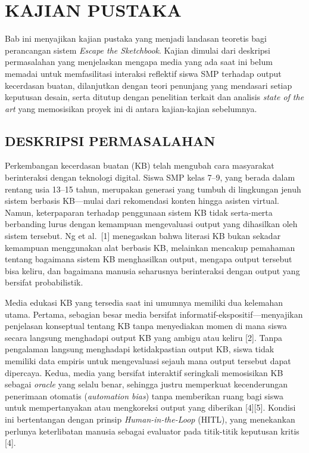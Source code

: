 \documentclass[10pt,twoside,openright]{report}
\begin{document}
\chapter{KAJIAN PUSTAKA}
\label{chap:bab2}

Bab ini menyajikan kajian pustaka yang menjadi landasan teoretis bagi perancangan sistem \textit{Escape the Sketchbook}. Kajian dimulai dari deskripsi permasalahan yang menjelaskan mengapa media yang ada saat ini belum memadai untuk memfasilitasi interaksi reflektif siswa SMP terhadap output kecerdasan buatan, dilanjutkan dengan teori penunjang yang mendasari setiap keputusan desain, serta ditutup dengan penelitian terkait dan analisis \textit{state of the art} yang memosisikan proyek ini di antara kajian-kajian sebelumnya.

\section{DESKRIPSI PERMASALAHAN}
\label{sec:deskripsi-permasalahan}

Perkembangan kecerdasan buatan (KB) telah mengubah cara masyarakat berinteraksi dengan teknologi digital. Siswa SMP kelas 7--9, yang berada dalam rentang usia 13--15 tahun, merupakan generasi yang tumbuh di lingkungan jenuh sistem berbasis KB---mulai dari rekomendasi konten hingga asisten virtual. Namun, keterpaparan terhadap penggunaan sistem KB tidak serta-merta berbanding lurus dengan kemampuan mengevaluasi output yang dihasilkan oleh sistem tersebut. Ng et al.\ [1] menegaskan bahwa literasi KB bukan sekadar kemampuan menggunakan alat berbasis KB, melainkan mencakup pemahaman tentang bagaimana sistem KB menghasilkan output, mengapa output tersebut bisa keliru, dan bagaimana manusia seharusnya berinteraksi dengan output yang bersifat probabilistik.

Media edukasi KB yang tersedia saat ini umumnya memiliki dua kelemahan utama. Pertama, sebagian besar media bersifat informatif-ekspositif---menyajikan penjelasan konseptual tentang KB tanpa menyediakan momen di mana siswa secara langsung menghadapi output KB yang ambigu atau keliru [2]. Tanpa pengalaman langsung menghadapi ketidakpastian output KB, siswa tidak memiliki data empiris untuk mengevaluasi sejauh mana output tersebut dapat dipercaya. Kedua, media yang bersifat interaktif seringkali memosisikan KB sebagai \textit{oracle} yang selalu benar, sehingga justru memperkuat kecenderungan penerimaan otomatis (\textit{automation bias}) tanpa memberikan ruang bagi siswa untuk mempertanyakan atau mengkoreksi output yang diberikan [4][5]. Kondisi ini bertentangan dengan prinsip \textit{Human-in-the-Loop} (HITL), yang menekankan perlunya keterlibatan manusia sebagai evaluator pada titik-titik keputusan kritis [4].
\end{document}
